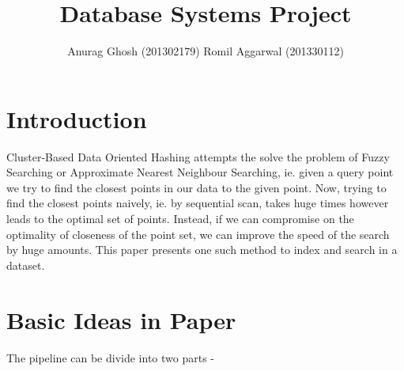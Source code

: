 \documentclass[10pt]{extarticle}
\title{Database Systems Project}
\author{Anurag Ghosh (201302179)  Romil Aggarwal (201330112)}
\begin{document}
\maketitle



\section*{Introduction}

Cluster-Based Data Oriented Hashing attempts the solve the problem of Fuzzy Searching or Approximate Nearest Neighbour Searching, ie. given a query point we try to find the closest points in our data to the given point. Now, trying to find the closest points naively, ie. by sequential scan, takes huge times however leads to the optimal set of points. Instead, if we can compromise on the optimality of closeness of the point set, we can improve the speed of the search by huge amounts. This paper presents one such method to index and search in a dataset.

\section*{Basic Ideas in Paper}

The pipeline can be divide into two parts - 
\end{document}
